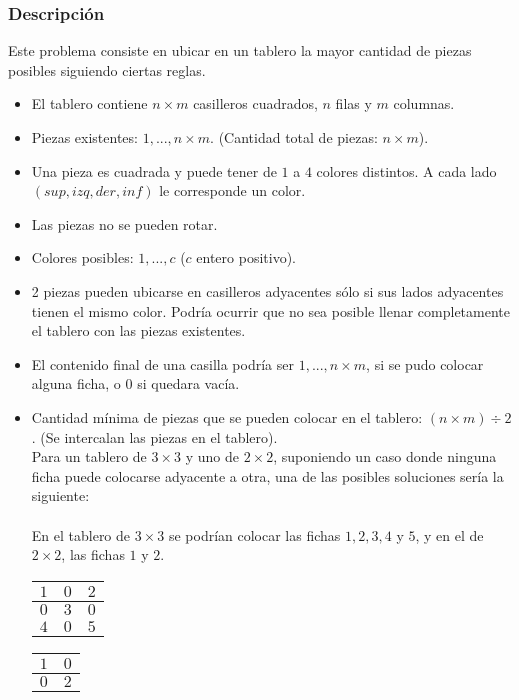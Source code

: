 \documentclass[11pt, a4paper, twoside]{article}
\begin{document}
{}

\subsubsection{Descripción}

Este problema consiste en ubicar en un tablero la mayor cantidad de piezas posibles siguiendo ciertas reglas.  

\begin{itemize}
	\item El tablero contiene $n \times m$ casilleros cuadrados, $n$ filas y $m$ columnas. 
	\item Piezas existentes: $1,...,n \times m$. (Cantidad total de piezas: $n \times m$).     
	\item Una pieza es cuadrada y puede tener de $1$ a $4$ colores distintos. A cada lado $(sup, izq, der, inf)$ le corresponde un color. 
	\item Las piezas no se pueden rotar.
	\item Colores posibles: $1,...,c$ ($c$ entero positivo). 
	\item 2 piezas pueden ubicarse en casilleros adyacentes sólo si sus lados adyacentes tienen el mismo color. Podría ocurrir que no sea posible llenar completamente el tablero con las piezas existentes. 
	\item El contenido final de una casilla podría ser $1,...,n \times m$, si se pudo colocar alguna ficha, o $0$ si quedara vacía. 
	\item Cantidad mínima de piezas que se pueden colocar en el tablero: $(n \times m)\div 2$. (Se intercalan las piezas en el tablero). \\
	Para un tablero de $3\times 3$ y uno de $2\times 2$, suponiendo un caso donde ninguna ficha puede colocarse adyacente a otra, una de las posibles soluciones sería la siguiente: \\
	\\
	En el tablero de $3\times 3$ se podrían colocar las fichas $1,2,3,4$ y $5$, y en el de $2\times 2$, las fichas $1$ y $2$.  \\

	\begin{minipage}{0.2\textwidth}
		\begin{tabular}{|c|c|c|}
			\hline
			 $1$ & $0$ & $2$ \\
			\hline
			 $0$ & $3$ & $0$  \\
			\hline 
			 $4$ & $0$ & $5$ \\
			\hline
		\end{tabular}
	\end{minipage}
	\begin{minipage}{0.2\textwidth}
		\begin{tabular}{|c|c|}
			\hline
			 $1$ & $0$ \\
			\hline
			 $0$ & $2$ \\
			\hline
		\end{tabular}
	\end{minipage}

\end{itemize} 
\end{document}

